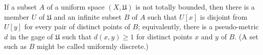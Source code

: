If a subset $A$ of a uniform space $(X, \mathfrak{U})$ is not totally bounded, then there is a member $U$ of $\mathfrak{U}$ and an infinite subset $B$ of $A$ such that $U[x]$ is disjoint from $U[y]$ for every pair of distinct points of $B$; equivalently, there is a pseudo-metric $d$ in the gage of $\mathfrak{U}$ such that $d(x, y) \geq 1$ for distinct points $x$ and $y$ of $B$. (A set such as $B$ might be called uniformly discrete.)
